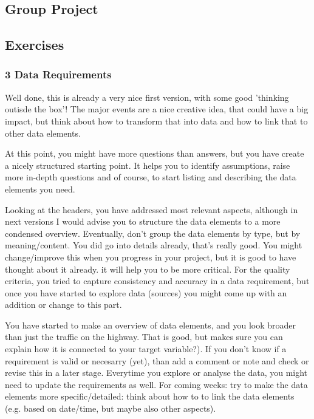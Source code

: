 \documentclass[a4paper, 11pt]{article}
\begin{document}
\subsection{Group Project}

\subsection{Exercises}

\subsubsection{3 Data Requirements}
Well done, this is already a very nice first version, with some good 'thinking outisde the box'! The major events are a nice creative idea, that could have a big impact, but think about how to transform that into data and how to link that to other data elements.

At this point, you might have more questions than answers, but you have create a nicely structured starting point. It helps you to identify assumptions, raise more in-depth questions and of course, to start listing and describing the data elements you need.

Looking at the headers, you have addressed most relevant aspects, although in next versions I would advise you to structure the data elements to a more condensed overview. Eventually, don't group the data elements by type, but by meaning/content. 
You did go into details already, that's really good. You might change/improve this when you progress in your project, but it is good to have thought about it already. it will help you to be more critical.
For the quality criteria, you tried to capture consistency and accuracy in a data requirement, but once you have started to explore data (sources) you might come up with an addition or change to this part. 

You have started to make an overview of data elements, and you look broader than just the traffic on the highway. That is good, but makes sure you can explain how it is connected to your target variable?). If you don't know if a requirement is valid or necesarry (yet), than add a comment or note and check or revise this in a later stage.
Everytime you explore or analyse the data, you might need to update the requirements as well.
For coming weeks: try to make the data elements more specific/detailed: think about how to to link the data elements (e.g. based on date/time, but maybe also other aspects).
\end{document}
